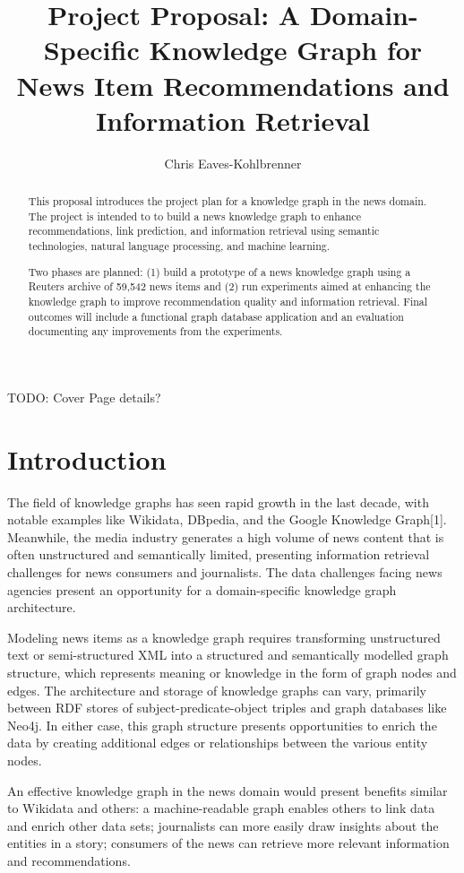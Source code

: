 \documentclass[11pt]{article}   	%
\title{Project Proposal: A Domain-Specific Knowledge Graph for News Item Recommendations and Information Retrieval}
\author{Chris Eaves-Kohlbrenner}
\begin{document}
\maketitle

TODO: Cover Page details?

\newpage
\begin{abstract}
This proposal introduces the project plan for a knowledge graph in the news domain. The project is intended to to build a news knowledge graph to enhance recommendations, link prediction, and information retrieval using semantic technologies, natural language processing, and machine learning.

Two phases are planned: (1) build a prototype of a news knowledge graph using a Reuters archive of 59,542 news items and (2) run experiments aimed at enhancing the knowledge graph to improve recommendation quality and information retrieval. Final outcomes will include a functional graph database application and an evaluation documenting any improvements from the experiments.
\end{abstract}

\newpage
\tableofcontents

\newpage
\section{Introduction}
The field of knowledge graphs has seen rapid growth in the last decade, with notable examples like Wikidata, DBpedia, and the Google Knowledge Graph[1]. Meanwhile, the media industry generates a high volume of news content that is often unstructured and semantically limited, presenting information retrieval challenges for news consumers and journalists. The data challenges facing news agencies present an opportunity for a domain-specific knowledge graph architecture. 

Modeling news items as a knowledge graph requires transforming unstructured text or semi-structured XML into a structured and semantically modelled graph structure, which represents meaning or knowledge in the form of graph nodes and edges. The architecture and storage of knowledge graphs can vary, primarily between RDF stores of subject-predicate-object triples and graph databases like Neo4j\cite{zhao2018architecture}. In either case, this graph structure presents opportunities to enrich the data by creating additional edges or relationships between the various entity nodes.

An effective knowledge graph in the news domain would present benefits similar to Wikidata and others: a machine-readable graph enables others to link data and enrich other data sets; journalists can more easily draw insights about the entities in a story; consumers of the news can retrieve more relevant information and recommendations.
\end{document}
